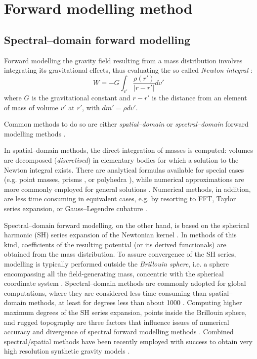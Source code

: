 \section{Forward modelling method}
\label{s:SigIs:Fwd}

\subsection{Spectral--domain forward modelling}
\label{ss:SigIs:Fwd:SHfwd}
Forward modelling the gravity field resulting from a mass distribution involves integrating its gravitational effects, thus evaluating the so called \textit{Newton integral} \parencite{HofmannWellenhof2006}:
\begin{equation}
    \label{eq:SHfwd:NewtonInt}
    W = - G \int_{v'} \frac{\rho(r')}{ \lvert r - r' \rvert } dv'
\end{equation}
where $G$ is the gravitational constant and $r - r'$ is the distance from an element of mass of volume $v'$ at $r'$, with $dm' = \rho dv'$.

Common methods to do so are either \textit{spatial--domain} or \textit{spectral--domain} forward modelling methods \parencite{Kuhn2005}.

In spatial--domain methods, the direct integration of masses is computed: volumes are decomposed (\textit{discretised}) in elementary bodies for which a solution to the Newton integral exists.
There are analytical formulas available for special cases (e.g. point masses, prisms \cites{Nagy2000}{Nagy2002}, or polyhedra \cites{Tsoulis2012}{Benedek2016}), while numerical approximations are more commonly employed for general solutions \parencites[e.g. spherical tesseroids][]{Heck2006}{Uieda2016}.
Numerical methods, in addition, are less time consuming in equivalent cases, e.g. by resorting to FFT, Taylor series expansion, or Gauss--Legendre cubature \parencite[see][and references therein]{Grombein2013}.
\nocite{Benedek2009} %

Spectral--domain forward modelling, on the other hand, is based on the spherical harmonic (SH) series expansion of the Newtonian kernel \parencites{Rummel1988}{Blakely1996}{Root2015}{Wieczorek2007}.
In methods of this kind, coefficients of the resulting potential (or its derived functionals) are obtained from the mass distribution.
To assure convergence of the SH series, modelling is typically performed outside the \textit{Brillouin sphere}, i.e. a sphere encompassing all the field-generating mass, concentric with the spherical coordinate system \parencite{Moritz1980}.
Spectral--domain methods are commonly adopted for global computations, where they are considered less time consuming than spatial--domain methods, at least for degrees less than about 1000 \parencite{Kuhn2005}.
Computing higher maximum degrees of the SH series expansion, points inside the Brillouin sphere, and rugged topography are three factors that influence issues of numerical accuracy and divergence of spectral forward modelling methods \parencites{Hu2015}{Hirt2017}.
Combined spectral/spatial methods have been recently employed with success to obtain very high resolution synthetic gravity models \parencite{Hirt2019}.

